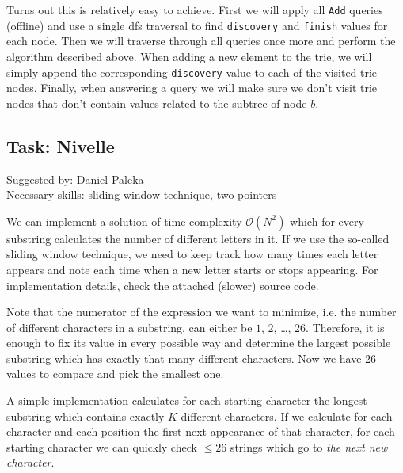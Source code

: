 \documentclass[a4paper]{article}
\begin{document}
Turns out this is relatively easy to achieve. First we will apply all
\texttt{Add} queries (offline) and use a single dfs traversal to find
\texttt{discovery} and \texttt{finish} values for each node. Then we will
traverse through all queries once more and perform the algorithm described
above. When adding a new element to the trie, we will simply append the
corresponding \texttt{discovery} value to each of the visited trie nodes.
Finally, when answering a query we will make sure we don't visit trie
nodes that don't contain values related to the subtree of node $b$.

\subsection*{Task: Nivelle}
\textsf{Suggested by: Daniel Paleka}\\
\textsf{Necessary skills: sliding window technique, two pointers}

We can implement a solution of time complexity $\mathcal{O}(N^2)$ which
for every substring calculates the number of different letters in it. If
we use the so-called sliding window technique, we need to keep track
how many times each letter appears and note each time when a new letter
starts or stops appearing. For implementation details, check the attached
(slower) source code.

Note that the numerator of the expression we want to minimize, i.e. the
number of different characters in a substring, can either be $1$, $2$, \dots,
$26$. Therefore, it is enough to fix its value in every possible way and
determine the largest possible substring which has exactly that many different
characters. Now we have $26$ values to compare and pick the smallest one.

A simple implementation calculates for each starting character the longest
substring which contains exactly $K$ different characters. If we calculate
for each character and each position the first next appearance of that
character, for each starting character we can quickly check $\le 26$ strings
which go to \textit{the next new character}.
\end{document}
